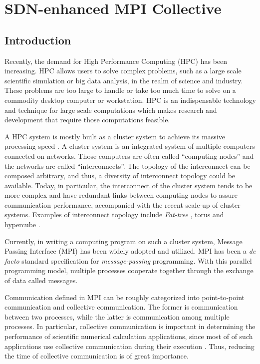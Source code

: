 \chapter{SDN-enhanced MPI Collective}

\hypertarget{introduction}{%
\section{Introduction}\label{introduction}}

Recently, the demand for High Performance Computing (HPC) has been
increasing. HPC allows users to solve complex problems, such as a large
scale scientific simulation or big data analysis, in the realm of
science and industry. These problems are too large to handle or take too
much time to solve on a commodity desktop computer or workstation. HPC
is an indispensable technology and technique for large scale
computations which makes research and development that require those
computations feasible.

A HPC system is mostly built as a cluster system to achieve its massive
processing speed \cite{top500}. A cluster system is an integrated system
of multiple computers connected on networks. Those computers are often
called ``computing nodes'' and the networks are called
``interconnects''. The topology of the interconnect can be composed
arbitrary, and thus, a diversity of interconnect topology could be
available. Today, in particular, the interconnect of the cluster system
tends to be more complex and have redundant links between computing
nodes to assure communication performance, accompanied with the recent
scale-up of cluster systems. Examples of interconnect topology include
\emph{Fat-tree} \cite{Leiserson1985}, torus \cite{Adiga2005} and
hypercube \cite{Dally2003}.

Currently, in writing a computing program on such a cluster system,
Message Passing Interface (MPI)
\cite{Gropp1999,MessagePassingInterfaceForum2012} has been widely
adopted and utilized. MPI has been a \emph{de facto} standard
specification for \emph{message-passing} programming. With this parallel
programming model, multiple processes cooperate together through the
exchange of data called messages.

Communication defined in MPI can be roughly categorized into
point-to-point communication and collective communication. The former is
communication between two processes, while the latter is communication
among multiple processes. In particular, collective communication is
important in determining the performance of scientific numerical
calculation applications, since most of of such applications use
collective communication during their execution \cite{Rabenseifner2000}.
Thus, reducing the time of collective communication is of great
importance.


